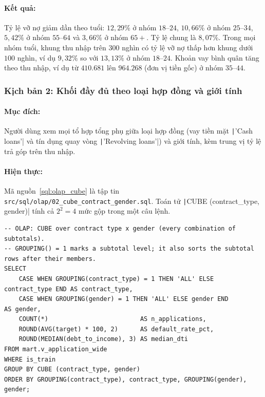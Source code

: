 \paragraph{Kết quả:} Tỷ lệ vỡ nợ giảm dần theo tuổi: $12{,}29\%$ ở nhóm $18$--$24$, $10{,}66\%$ ở nhóm $25$--$34$, $5{,}42\%$ ở nhóm $55$--$64$ và $3{,}66\%$ ở nhóm $65+$. Tỷ lệ chung là $8{,}07\%$. Trong mọi nhóm tuổi, khung thu nhập trên $300$ nghìn có tỷ lệ vỡ nợ thấp hơn khung dưới $100$ nghìn, ví dụ $9{,}32\%$ so với $13{,}13\%$ ở nhóm $18$--$24$. Khoản vay bình quân tăng theo thu nhập, ví dụ từ $410.681$ lên $964.268$ (đơn vị tiền gốc) ở nhóm $35$--$44$.

\subsubsection*{Kịch bản 2: Khối đầy đủ theo loại hợp đồng và giới tính}
\paragraph{Mục đích:} Người dùng xem mọi tổ hợp tổng phụ giữa loại hợp đồng (vay tiền mặt \texttt|'Cash loans'| và tín dụng quay vòng \texttt|'Revolving loans'|) và giới tính, kèm trung vị tỷ lệ trả góp trên thu nhập.
\paragraph{Hiện thực:} Mã nguồn~\ref{sql:olap_cube} là tập tin \texttt{src/sql/olap/}\allowbreak\texttt{02\_cube\_contract\_gender.sql}. Toán tử \texttt|CUBE (contract_type, gender)| tính cả $2^2 = 4$ mức gộp trong một câu lệnh.

\begin{listing}[H]
	\footnotesize
	\begin{verbatim}
-- OLAP: CUBE over contract type x gender (every combination of subtotals).
-- GROUPING() = 1 marks a subtotal level; it also sorts the subtotal rows after their members.
SELECT
    CASE WHEN GROUPING(contract_type) = 1 THEN 'ALL' ELSE contract_type END AS contract_type,
    CASE WHEN GROUPING(gender) = 1 THEN 'ALL' ELSE gender END               AS gender,
    COUNT(*)                         AS n_applications,
    ROUND(AVG(target) * 100, 2)      AS default_rate_pct,
    ROUND(MEDIAN(debt_to_income), 3) AS median_dti
FROM mart.v_application_wide
WHERE is_train
GROUP BY CUBE (contract_type, gender)
ORDER BY GROUPING(contract_type), contract_type, GROUPING(gender), gender;
\end{verbatim}
	\caption{Truy vấn khối đầy đủ theo loại hợp đồng và giới tính}
	\label{sql:olap_cube}
\end{listing}


